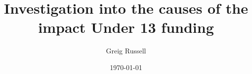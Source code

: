 \documentclass[11pt,a4paper]{article}
\title{\textbf{Investigation into the causes of the impact Under 13 funding}}
\author{Greig Russell}
\date{\today}
\begin{document}
\maketitle

\begin{abstract}

\end{abstract}


\end{document}
